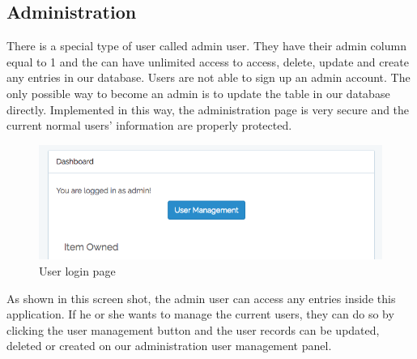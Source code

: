 \subsection{Administration}
There is a special type of user called admin user. They have their admin column equal to 1 and the can have unlimited access to access, delete, update and create any entries in our database. Users are not able to sign up an admin account. The only possible way to become an admin is to update the table in our database directly. Implemented in this way, the administration page is very secure and the current normal users' information are properly protected.
\begin{figure}[h]
      \centering
	\includegraphics[scale=0.3]{admin.png}
      \caption{User login page}
\end{figure}
As shown in this screen shot, the admin user can access any entries inside this application. If he or she wants to manage the current users, they can do so by clicking the user management button and the user records can be updated, deleted or created on our administration user management panel.

\newpage

